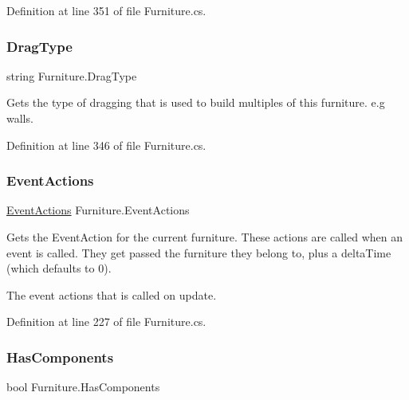 Definition at line 351 of file Furniture.\+cs.

\mbox{\label{class_furniture_ae368a4dd184283499a882e715b8a8388}} 
\subsubsection{\texorpdfstring{Drag\+Type}{DragType}}
{\footnotesize\ttfamily string Furniture.\+Drag\+Type\hspace{0.3cm}{\ttfamily [get]}}



Gets the type of dragging that is used to build multiples of this furniture. e.\+g walls. 



Definition at line 346 of file Furniture.\+cs.

\mbox{\label{class_furniture_a56ff5780eea7e88478de948193cf2191}} 
\subsubsection{\texorpdfstring{Event\+Actions}{EventActions}}
{\footnotesize\ttfamily \hyperlink{class_event_actions}{Event\+Actions} Furniture.\+Event\+Actions\hspace{0.3cm}{\ttfamily [get]}}



Gets the Event\+Action for the current furniture. These actions are called when an event is called. They get passed the furniture they belong to, plus a delta\+Time (which defaults to 0). 

The event actions that is called on update.

Definition at line 227 of file Furniture.\+cs.

\mbox{\label{class_furniture_ac105738f22c551e0420de3efa348c6d2}} 
\subsubsection{\texorpdfstring{Has\+Components}{HasComponents}}
{\footnotesize\ttfamily bool Furniture.\+Has\+Components\hspace{0.3cm}{\ttfamily [get]}}




